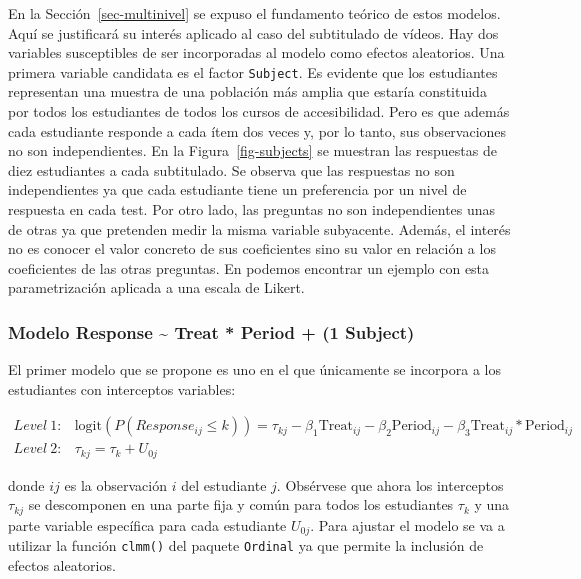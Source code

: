 \documentclass[
  12pt,
  a4paper,
  extrafontsizes,
  onecolumn,
  openright,
  table]{memoir}
\begin{document}
En la Sección~\ref{sec-multinivel} se expuso el fundamento teórico de
estos modelos. Aquí se justificará su interés aplicado al caso del
subtitulado de vídeos. Hay dos variables susceptibles de ser
incorporadas al modelo como efectos aleatorios. Una primera variable
candidata es el factor \texttt{Subject}. Es evidente que los estudiantes
representan una muestra de una población más amplia que estaría
constituida por todos los estudiantes de todos los cursos de
accesibilidad. Pero es que además cada estudiante responde a cada ítem
dos veces y, por lo tanto, sus observaciones no son independientes. En
la Figura~\ref{fig-subjects} se muestran las respuestas de diez
estudiantes a cada subtitulado. Se observa que las respuestas no son
independientes ya que cada estudiante tiene un preferencia por un nivel
de respuesta en cada test. Por otro lado, las preguntas no son
independientes unas de otras ya que pretenden medir la misma variable
subyacente. Además, el interés no es conocer el valor concreto de sus
coeficientes sino su valor en relación a los coeficientes de las otras
preguntas. En \textcite[pp.~14-16]{burkner2021}
\textcite[pp.~19-20]{burkner2019} podemos encontrar un ejemplo con esta
parametrización aplicada a una escala de Likert.

\hypertarget{modelo-response-treat-period-1-subject}{%
\subsubsection{Modelo Response \textasciitilde{} Treat * Period + (1
\textbar{} Subject)}\label{modelo-response-treat-period-1-subject}}

El primer modelo que se propone es uno en el que únicamente se incorpora
a los estudiantes con interceptos variables:

\small

\[
\begin{aligned}
Level\ 1: & \text{logit}(P(Response_{ij} \leq k)) = \tau_{kj} - \beta_1 \text{Treat}_{ij} - \beta_2 \text{Period}_{ij} - \beta_3 \text{Treat}_{ij} * \text{Period}_{ij} \\
Level\ 2: & \tau_{kj}  =  \tau_{k} + U_{0j}
\end{aligned}
\]

\normalsize

donde \(ij\) es la observación \(i\) del estudiante \(j\). Obsérvese que
ahora los interceptos \(\tau_{kj}\) se descomponen en una parte fija y
común para todos los estudiantes \(\tau_{k}\) y una parte variable
específica para cada estudiante \(U_{0j}\). Para ajustar el modelo se va
a utilizar la función \texttt{clmm()} del paquete \texttt{Ordinal} ya
que permite la inclusión de efectos aleatorios.
\end{document}
